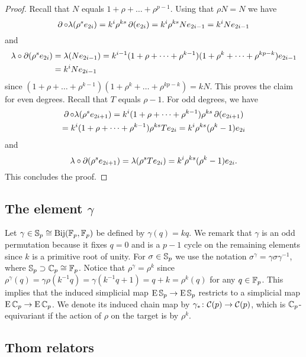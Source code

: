 \begin{proof}
	Recall that $N$ equals $1+\rho+\dots+\rho^{p-1}$.
	Using that $\rho N = N$ we have
	\[
	\operatorname{\partial} \mathbin{\circ} \lambda(\rho^s e_{2i}) = k^i \rho^{ks} \operatorname{\partial} (e_{2i}) = k^i \rho^{ks} N e_{2i-1} = k^i N e_{2i-1}
	\]
	and
	\begin{align*}
		\lambda \mathbin{\circ} \operatorname{\partial}(\rho^s e_{2i}) &= \lambda(N e_{2i-1}) = k^{i-1}(1+\rho+\dots+\rho^{k-1}) (1+\rho^k+\dots+\rho^{kp-k}) e_{2i-1} \\ &=
		k^i N e_{2i-1}
	\end{align*}
	since $(1+\rho+\dots+\rho^{k-1}) (1+\rho^k+\dots+\rho^{kp-k}) = kN$.
	This proves the claim for even degrees.
	Recall that $T$ equals $\rho - 1$.
	For odd degrees, we have
	\begin{multline*}
		\operatorname{\partial} \mathbin{\circ} \lambda(\rho^s e_{2i+1}) = k^i (1+\rho+\dots+\rho^{k-1}) \rho^{ks} \operatorname{\partial} (e_{2i+1}) \\
		= k^i (1+\rho+\dots+\rho^{k-1}) \rho^{ks} T e_{2i} = k^i \rho^{ks} (\rho^k-1) e_{2i}
	\end{multline*}
	and
	\[
	\lambda \mathbin{\circ} \operatorname{\partial}(\rho^s e_{2i+1}) = \lambda(\rho^s T e_{2i}) = k^i\rho^{ks}(\rho^k-1) e_{2i}.
	\]
	This concludes the proof.
\end{proof}

\subsection{The element $\gamma$}

Let $\gamma \in \mathbb{S}_p \cong \mathrm{Bij}({\mathbb{F}_p}, {\mathbb{F}_p})$ be defined by $\gamma(q) = kq$.
We remark that $\gamma$ is an odd permutation because it fixes $q = 0$ and is a $p-1$ cycle on the remaining elements since $k$ is a primitive root of unity.
For $\sigma \in \mathbb{S}_p$ we use the notation $\sigma^\gamma = \gamma \sigma \gamma^{-1}$, where $\mathbb{S}_p \supset \mathbb{C}_p \cong {\mathbb{F}_p}$.
Notice that $\rho^\gamma = \rho^k$ since $\rho^\gamma(q) = \gamma \rho(k^{-1}q) = \gamma(k^{-1} q + 1) = q + k = \rho^k(q)$ for any $q \in {\mathbb{F}_p}$.
This implies that the induced simplicial map $\operatorname{E}\mathbb{S}_p \to \operatorname{E}\mathbb{S}_p$ restricts to a simplicial map $\operatorname{E}\mathbb{C}_p \to \operatorname{E}\mathbb{C}_p$.
We denote its induced chain map by $\gamma_\ast \colon \mathcal{C}(p) \to \mathcal{C}(p)$, which is $\mathbb{C}_p$-equivariant if the action of $\rho$ on the target is by $\rho^k$.

\subsection{Thom relators}

